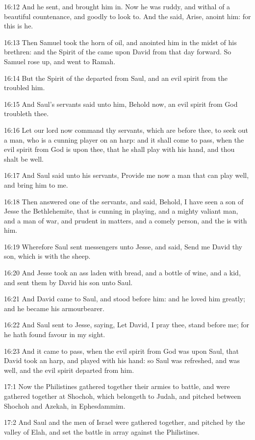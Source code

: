 16:12 And he sent, and brought him in. Now he was ruddy, and withal of
a beautiful countenance, and goodly to look to. And the \LORD said,
Arise, anoint him: for this is he.

16:13 Then Samuel took the horn of oil, and anointed him in the midst
of his brethren: and the Spirit of the \LORD came upon David from that
day forward. So Samuel rose up, and went to Ramah.

16:14 But the Spirit of the \LORD departed from Saul, and an evil
spirit from the \LORD troubled him.

16:15 And Saul's servants said unto him, Behold now, an evil spirit
from God troubleth thee.

16:16 Let our lord now command thy servants, which are before thee, to
seek out a man, who is a cunning player on an harp: and it shall come
to pass, when the evil spirit from God is upon thee, that he shall
play with his hand, and thou shalt be well.

16:17 And Saul said unto his servants, Provide me now a man that can
play well, and bring him to me.

16:18 Then answered one of the servants, and said, Behold, I have seen
a son of Jesse the Bethlehemite, that is cunning in playing, and a
mighty valiant man, and a man of war, and prudent in matters, and a
comely person, and the \LORD is with him.

16:19 Wherefore Saul sent messengers unto Jesse, and said, Send me
David thy son, which is with the sheep.

16:20 And Jesse took an ass laden with bread, and a bottle of wine,
and a kid, and sent them by David his son unto Saul.

16:21 And David came to Saul, and stood before him: and he loved him
greatly; and he became his armourbearer.

16:22 And Saul sent to Jesse, saying, Let David, I pray thee, stand
before me; for he hath found favour in my sight.

16:23 And it came to pass, when the evil spirit from God was upon
Saul, that David took an harp, and played with his hand: so Saul was
refreshed, and was well, and the evil spirit departed from him.

17:1 Now the Philistines gathered together their armies to battle, and
were gathered together at Shochoh, which belongeth to Judah, and
pitched between Shochoh and Azekah, in Ephesdammim.

17:2 And Saul and the men of Israel were gathered together, and
pitched by the valley of Elah, and set the battle in array against the
Philistines.

